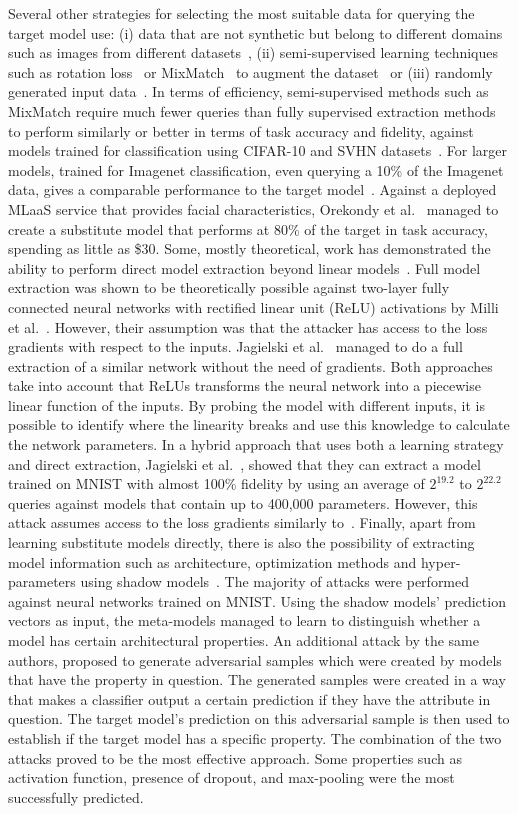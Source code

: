 Several other strategies for selecting the most suitable data for querying the target model use: (i) data that are not synthetic but belong to different domains such as images from different datasets~, (ii) semi-supervised learning techniques such as rotation loss~ or MixMatch~ to augment the dataset~ or (iii) randomly generated input data~. In terms of efficiency, semi-supervised methods such as MixMatch require much fewer queries than fully supervised extraction methods to perform similarly or better in terms of task accuracy and fidelity, against models trained for classification using CIFAR-10 and SVHN datasets~. For larger models, trained for Imagenet classification, even querying a 10\% of the Imagenet data, gives a comparable performance to the target model~. Against a deployed MLaaS service that provides facial characteristics, Orekondy et al.~ managed to create a substitute model that performs at 80\% of the target in task accuracy, spending as little as \$30.
Some, mostly theoretical, work has demonstrated the ability to perform direct model extraction beyond linear models~. Full model extraction was shown to be theoretically possible against two-layer fully connected neural networks with rectified linear unit (ReLU) activations by Milli et al.~. However, their assumption was that the attacker has access to the loss gradients with respect to the inputs. Jagielski et al.~ managed to do a full extraction of a similar network without the need of gradients. Both approaches take into account that ReLUs transforms the neural network into a piecewise linear function of the inputs. By probing the model with different inputs, it is possible to identify where the linearity breaks and use this knowledge to calculate the network parameters. In a hybrid approach that uses both a learning strategy and direct extraction, Jagielski et al.~, showed that they can extract a model trained on MNIST with almost 100\% fidelity by using an average of $2^{19.2}$ to $2^{22.2}$ queries against models that contain up to 400,000 parameters. However, this attack assumes access to the loss gradients similarly to~.
Finally, apart from learning substitute models directly, there is also the possibility of extracting model information such as architecture, optimization methods and hyper-parameters using shadow models~. The majority of attacks were performed against neural networks trained on MNIST. Using the shadow models' prediction vectors as input, the meta-models managed to learn to distinguish whether a model has certain architectural properties. An additional attack by the same authors, proposed to generate adversarial samples which were created by models that have the property in question. The generated samples were created in a way that makes a classifier output a certain prediction if they have the attribute in question. The target model's prediction on this adversarial sample is then used to establish if the target model has a specific property. The combination of the two attacks proved to be the most effective approach. Some properties such as activation function, presence of dropout, and max-pooling were the most successfully predicted.

